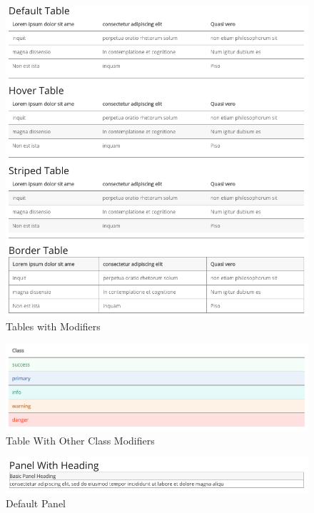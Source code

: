 \begin{figure}[h]
\caption{Tables with Modifiers}
  \label{fig:tableMod}
\includegraphics[scale=0.4]{../public/images/tables}
\centering
\end{figure}

\begin{figure}[h]
\caption{Table With Other Class Modifiers}
  \label{fig:tableClass}
  \includegraphics[scale=0.3]{../public/images/tableClass}
\centering
\end{figure}

\begin{figure}[h]
\caption{Default Panel}
  \label{fig:panel}
  \includegraphics[scale=0.4]{../public/images/panel}
\centering
\end{figure}

